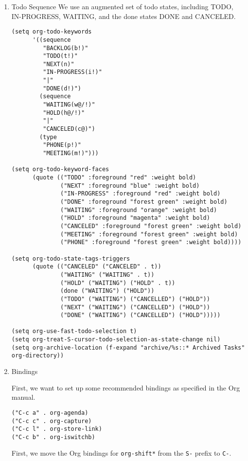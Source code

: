 \documentclass[11pt]{article}
\begin{document}
\begin{enumerate}
\begin{enumerate}
\begin{verbatim}
(add-hook 'org-mode-hook 'the-fix-easy-templates)
\end{verbatim}

\item Todo Sequence
\label{sec:org699f8a4}
We use an augmented set of todo states, including TODO, IN-PROGRESS,
WAITING, and the done states DONE and CANCELED.
\begin{verbatim}
(setq org-todo-keywords
      '((sequence
         "BACKLOG(b!)"
         "TODO(t!)"
         "NEXT(n)"
         "IN-PROGRESS(i!)"
         "|"
         "DONE(d!)")
        (sequence
         "WAITING(w@/!)"
         "HOLD(h@/!)"
         "|"
         "CANCELED(c@)")
        (type
         "PHONE(p!)"
         "MEETING(m!)")))

(setq org-todo-keyword-faces
      (quote (("TODO" :foreground "red" :weight bold)
              ("NEXT" :foreground "blue" :weight bold)
              ("IN-PROGRESS" :foreground "red" :weight bold)
              ("DONE" :foreground "forest green" :weight bold)
              ("WAITING" :foreground "orange" :weight bold)
              ("HOLD" :foreground "magenta" :weight bold)
              ("CANCELED" :foreground "forest green" :weight bold)
              ("MEETING" :foreground "forest green" :weight bold)
              ("PHONE" :foreground "forest green" :weight bold))))

(setq org-todo-state-tags-triggers
      (quote (("CANCELED" ("CANCELED" . t))
              ("WAITING" ("WAITING" . t))
              ("HOLD" ("WAITING") ("HOLD" . t))
              (done ("WAITING") ("HOLD"))
              ("TODO" ("WAITING") ("CANCELLED") ("HOLD"))
              ("NEXT" ("WAITING") ("CANCELLED") ("HOLD"))
              ("DONE" ("WAITING") ("CANCELLED") ("HOLD")))))

(setq org-use-fast-todo-selection t)
(setq org-treat-S-cursor-todo-selection-as-state-change nil)
(setq org-archive-location (f-expand "archive/%s::* Archived Tasks" org-directory))
\end{verbatim}
\item Bindings
\label{sec:orgdc570ce}

First, we want to set up some recommended bindings as specified in the
Org manual.

\begin{verbatim}
("C-c a" . org-agenda)
("C-c c" . org-capture)
("C-c l" . org-store-link)
("C-c b" . org-iswitchb)
\end{verbatim}

First, we move the Org bindings for \texttt{org-shift*} from the \texttt{S-} prefix
to \texttt{C-}.


\end{enumerate}
\end{enumerate}
\end{document}

